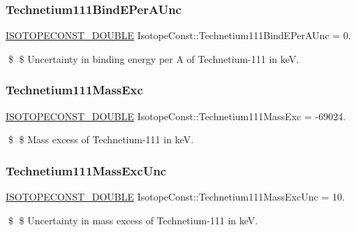 \subsubsection{\texorpdfstring{Technetium111\+Bind\+E\+Per\+A\+Unc}{Technetium111BindEPerAUnc}}
{\footnotesize\ttfamily \mbox{\hyperlink{group___isotope_const-_macros_ga8f45a7272ce02c0b4c65c44636ed719a}{I\+S\+O\+T\+O\+P\+E\+C\+O\+N\+S\+T\+\_\+\+D\+O\+U\+B\+LE}} Isotope\+Const\+::\+Technetium111\+Bind\+E\+Per\+A\+Unc = 0.}

\$ \$ Uncertainty in binding energy per A of Technetium-\/111 in keV. \mbox{\label{group___isotope_const-_technetium-_tc111_ga2883e8a958c993a7eb3a7460e6686c84}} 
\subsubsection{\texorpdfstring{Technetium111\+Mass\+Exc}{Technetium111MassExc}}
{\footnotesize\ttfamily \mbox{\hyperlink{group___isotope_const-_macros_ga8f45a7272ce02c0b4c65c44636ed719a}{I\+S\+O\+T\+O\+P\+E\+C\+O\+N\+S\+T\+\_\+\+D\+O\+U\+B\+LE}} Isotope\+Const\+::\+Technetium111\+Mass\+Exc = -\/69024.}

\$ \$ Mass excess of Technetium-\/111 in keV. \mbox{\label{group___isotope_const-_technetium-_tc111_ga4084738669642336740ffca0cb7b675c}} 
\subsubsection{\texorpdfstring{Technetium111\+Mass\+Exc\+Unc}{Technetium111MassExcUnc}}
{\footnotesize\ttfamily \mbox{\hyperlink{group___isotope_const-_macros_ga8f45a7272ce02c0b4c65c44636ed719a}{I\+S\+O\+T\+O\+P\+E\+C\+O\+N\+S\+T\+\_\+\+D\+O\+U\+B\+LE}} Isotope\+Const\+::\+Technetium111\+Mass\+Exc\+Unc = 10.}

\$ \$ Uncertainty in mass excess of Technetium-\/111 in keV. \mbox{\label{group___isotope_const-_technetium-_tc111_ga3d369d0ae19ccb4c6f620dae9b7b6989}} 
